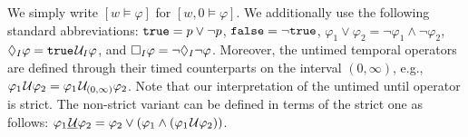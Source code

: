 We simply write $[w \models \varphi]$ for $[w,0 \models \varphi]$.
We additionally use the following standard abbreviations: 
$\texttt{true} = p \lor \lnot p$,
$\texttt{false} = \lnot \texttt{true}$,
$ \varphi_1 \lor \varphi_2 = \lnot \varphi_1 \land \lnot \varphi_2$,
$\lozenge_I \varphi = \texttt{true} \kern.1em\mathcal{U}_I \varphi$, and
$\square_I \varphi = \lnot \lozenge_I \lnot \varphi$.
Moreover, the untimed temporal operators are defined through their timed counterparts on the interval $(0,\infty)$, e.g., $\varphi_1 \kern.1em\mathcal{U} \varphi_2 = \varphi_1 \kern.1em\mathcal{U}_{(0,\infty)} \varphi_2$.
Note that our interpretation of the untimed until operator is strict.
The non-strict variant can be defined in terms of the strict one as follows: $\varphi_1 \underline{\kern.1em\mathcal{U}} \varphi_2 = \varphi_2 \lor (\varphi_1 \land (\varphi_1 \kern.1em\mathcal{U} \varphi_2))$.

